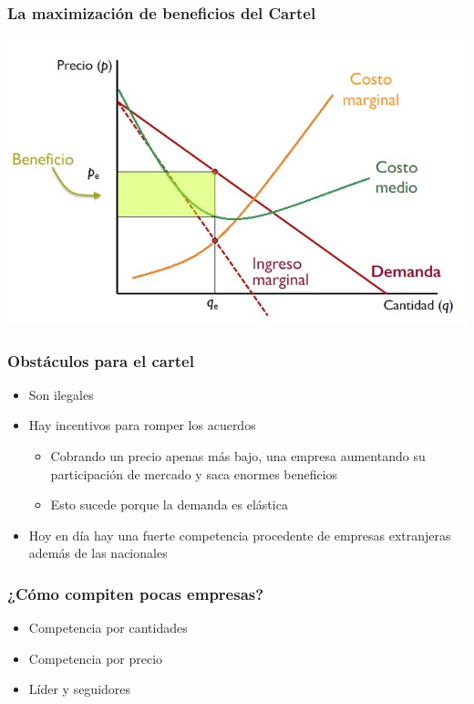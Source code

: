 \documentclass{beamer}
\begin{document}
\begin{frame}
\frametitle{ La maximización de beneficios del Cartel}
\includegraphics[scale=0.6]{Figures/Tema_06.35_beneficios2.jpg}
\end{frame}

\begin{frame}
\frametitle{Obstáculos para el cartel}
\begin{itemize}
    \item Son ilegales 
    \item Hay incentivos para romper los acuerdos
    \begin{itemize}
        \item Cobrando un precio apenas más bajo, una empresa aumentando su participación de mercado y saca enormes beneficios
        \item Esto sucede porque la demanda es elástica
    \end{itemize}
    \item Hoy en día hay una fuerte competencia procedente de empresas extranjeras además de las nacionales
\end{itemize}
\end{frame}

\begin{frame}
\frametitle{ ¿Cómo compiten pocas empresas?}
\begin{itemize}
    \item Competencia por cantidades \vspace{1mm}
    \item Competencia por precio  \vspace{1mm}
    \item Líder y seguidores 
\end{itemize}
\end{frame}
\end{document}
